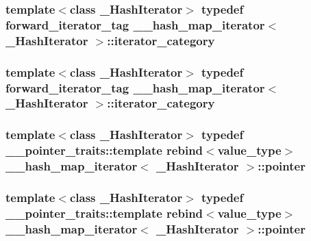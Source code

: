\subsubsection[{iterator\+\_\+category}]{\setlength{\rightskip}{0pt plus 5cm}template$<$class \+\_\+\+Hash\+Iterator$>$ typedef forward\+\_\+iterator\+\_\+tag {\bf \+\_\+\+\_\+hash\+\_\+map\+\_\+iterator}$<$ \+\_\+\+Hash\+Iterator $>$\+::{\bf iterator\+\_\+category}}\label{class____hash__map__iterator_a82c25b4c3cbb1ea424ffae9832716982}
\hypertarget{class____hash__map__iterator_a82c25b4c3cbb1ea424ffae9832716982}{}
\subsubsection[{iterator\+\_\+category}]{\setlength{\rightskip}{0pt plus 5cm}template$<$class \+\_\+\+Hash\+Iterator$>$ typedef forward\+\_\+iterator\+\_\+tag {\bf \+\_\+\+\_\+hash\+\_\+map\+\_\+iterator}$<$ \+\_\+\+Hash\+Iterator $>$\+::{\bf iterator\+\_\+category}}\label{class____hash__map__iterator_a82c25b4c3cbb1ea424ffae9832716982}
\hypertarget{class____hash__map__iterator_a70e6b7226949cef63f92500927ca19a3}{}
\subsubsection[{pointer}]{\setlength{\rightskip}{0pt plus 5cm}template$<$class \+\_\+\+Hash\+Iterator$>$ typedef \+\_\+\+\_\+pointer\+\_\+traits\+::template rebind$<${\bf value\+\_\+type}$>$ {\bf \+\_\+\+\_\+hash\+\_\+map\+\_\+iterator}$<$ \+\_\+\+Hash\+Iterator $>$\+::{\bf pointer}}\label{class____hash__map__iterator_a70e6b7226949cef63f92500927ca19a3}
\hypertarget{class____hash__map__iterator_a70e6b7226949cef63f92500927ca19a3}{}
\subsubsection[{pointer}]{\setlength{\rightskip}{0pt plus 5cm}template$<$class \+\_\+\+Hash\+Iterator$>$ typedef \+\_\+\+\_\+pointer\+\_\+traits\+::template rebind$<${\bf value\+\_\+type}$>$ {\bf \+\_\+\+\_\+hash\+\_\+map\+\_\+iterator}$<$ \+\_\+\+Hash\+Iterator $>$\+::{\bf pointer}}\label{class____hash__map__iterator_a70e6b7226949cef63f92500927ca19a3}
\hypertarget{class____hash__map__iterator_a61a3f5fd8f3139155d5ceb11d125af3e}{}
